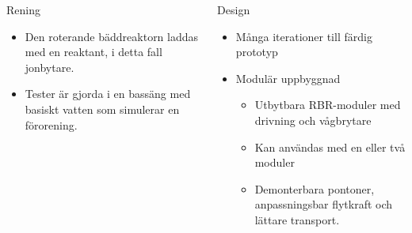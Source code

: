 \documentclass[final]{beamer}
\newlength{\onecolwid}
\begin{document}
\begin{frame}[t]
\begin{columns}[t, totalwidth=\textwidth]
\begin{column}{\onecolwid}
      \begin{block}{Rening}
        \begin{itemize}
        \item Den roterande bäddreaktorn laddas med en reaktant, i detta fall jonbytare.
        \item Tester är gjorda i en bassäng med basiskt vatten som simulerar en förorening.
        \end{itemize}

      \end{block}

    \end{column}

    \begin{column}{\onecolwid}

      \begin{block}{Design}
        \begin{itemize}
        \item Många iterationer till färdig prototyp

        \item Modulär uppbyggnad
          \begin{itemize}
          \item Utbytbara RBR-moduler med drivning och vågbrytare
          \item Kan användas med en eller två moduler
          \item Demonterbara pontoner, anpassningsbar flytkraft och lättare transport.
          \end{itemize}
        \end{itemize}


\end{block}
\end{column}
\end{columns}
\end{frame}
\end{document}
